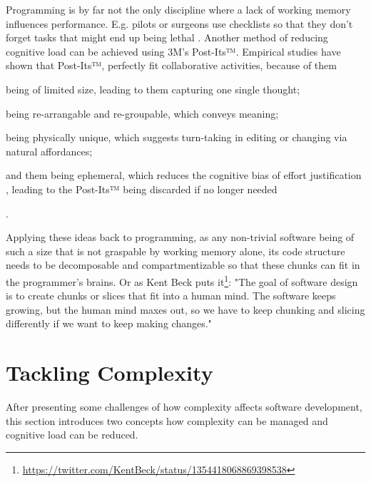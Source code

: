 Programming is by far not the only discipline where a lack of working memory influences performance.
E.g. pilots or surgeons use checklists so that they don't forget tasks that might end up being lethal \cite{seemann_code_2021}.
Another method of reducing cognitive load can be achieved using 3M's Post-Its™.
Empirical studies \cite{digiano_learning_nodate, dove_grouping_2018} have shown that Post-Its™, perfectly fit collaborative activities, because of them
\begin{enumerate*}[label=(\roman*)]
\item being of limited size, leading to them capturing one single thought;
\item being re-arrangable and re-groupable, which conveys meaning;
\item being physically unique, which suggests turn-taking in editing or changing via natural affordances;
\item and them being ephemeral, which reduces the cognitive bias of effort justification \cite{norton_ikea_2012}, leading to the Post-Its™ being discarded if no longer needed
\end{enumerate*}.

Applying these ideas back to programming, as any non-trivial software being of such a size that is not graspable by working memory alone, its code structure needs to be decomposable and compartmentizable so that these chunks can fit in the programmer's brains.
Or as Kent Beck puts it\footnote{\url{https://twitter.com/KentBeck/status/1354418068869398538}}: "The goal of software design is to create chunks or slices that fit into a human mind. The software keeps growing, but the human mind maxes out, so we have to keep chunking and slicing differently if we want to keep making changes."



\section{Tackling Complexity}
\label{sec:tackling-complexity}
After presenting some challenges of how complexity affects software development, this section introduces two concepts how complexity can be managed and cognitive load can be reduced.


